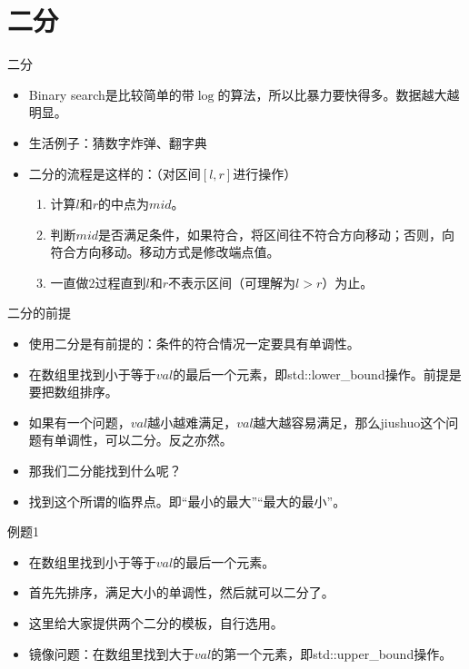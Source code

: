 \documentclass{beamer}[UTF-8]
\begin{document}
\section{二分} %
\begin{frame}{二分}
 \pause
\begin{itemize}
\item Binary search是比较简单的带$\log$的算法，所以比暴力要快得多。数据越大越明显。 \pause
\item 生活例子：猜数字炸弹、翻字典 \pause
\item 二分的流程是这样的：（对区间$[l,r]$进行操作） \pause
\begin{enumerate}
\item 计算$l$和$r$的中点为$mid$。 \pause
\item 判断$mid$是否满足条件，如果符合，将区间往不符合方向移动；否则，向符合方向移动。移动方式是修改端点值。 \pause
\item 一直做2过程直到$l$和$r$不表示区间（可理解为$l>r$）为止。
\end{enumerate}
\end{itemize}
\end{frame}

\begin{frame}{二分的前提}
 \pause
\begin{itemize}
\item 使用二分是有前提的：条件的符合情况一定要具有单调性。 \pause
\item 在数组里找到小于等于$val$的最后一个元素，即std::lower\_bound操作。前提是要把数组排序。 \pause
\item 如果有一个问题，$val$越小越难满足，$val$越大越容易满足，那么jiushuo这个问题有单调性，可以二分。反之亦然。 \pause
\item 那我们二分能找到什么呢？ \pause
\item 找到这个所谓的临界点。即“最小的最大”“最大的最小”。
\end{itemize}
\end{frame}

\begin{frame}{例题1}
 \pause
\begin{itemize}
\item 在数组里找到小于等于$val$的最后一个元素。 \pause
\item 首先先排序，满足大小的单调性，然后就可以二分了。 \pause
\item 这里给大家提供两个二分的模板，自行选用。 \pause
\item 镜像问题：在数组里找到大于$val$的第一个元素，即std::upper\_bound操作。
\end{itemize}
\end{frame}
\end{document}
